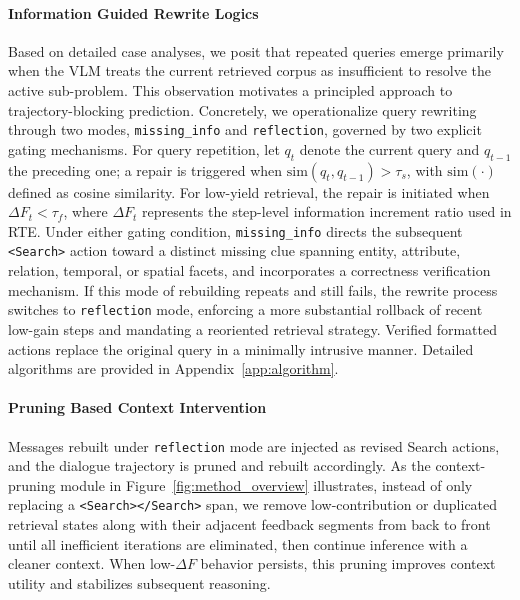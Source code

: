 \documentclass{article} %
\begin{document}
\paragraph{Information Guided Rewrite Logics}
Based on detailed case analyses, we posit that repeated queries emerge primarily when the VLM treats the current retrieved corpus as insufficient to resolve the active sub-problem.
This observation motivates a principled approach to trajectory-blocking prediction.
Concretely, we operationalize query rewriting through two modes, \texttt{missing\_info} and \texttt{reflection}, governed by two explicit gating mechanisms.
For query repetition, let $q_t$ denote the current query and $q_{t-1}$ the preceding one; a repair is triggered when $\mathrm{sim}(q_t,q_{t-1}) > \tau_s$, with $\mathrm{sim}(\cdot)$ defined as cosine similarity.
For low-yield retrieval, the repair is initiated when $\Delta F_t < \tau_f$, where $\Delta F_t$ represents the step-level information increment ratio used in RTE.
Under either gating condition, \texttt{missing\_info} directs the subsequent \texttt{<Search>} action toward a distinct missing clue spanning entity, attribute, relation, temporal, or spatial facets, and incorporates a correctness verification mechanism.
If this mode of rebuilding repeats and still fails, the rewrite process switches to \texttt{reflection} mode, enforcing a more substantial rollback of recent low-gain steps and mandating a reoriented retrieval strategy.
Verified formatted actions replace the original query in a minimally intrusive manner. Detailed algorithms are provided in Appendix~\ref{app:algorithm}.
\paragraph{Pruning Based Context Intervention}
Messages rebuilt under \texttt{reflection} mode are injected as revised Search actions, and the dialogue trajectory is pruned and rebuilt accordingly.
As the context-pruning module in Figure~\ref{fig:method_overview} illustrates, instead of only replacing a \texttt{<Search></Search>} span, we remove low-contribution or duplicated retrieval states along with their adjacent feedback segments from back to front until all inefficient iterations are eliminated, then continue inference with a cleaner context.
When low-$\Delta F$ behavior persists, this pruning improves context utility and stabilizes subsequent reasoning.
\end{document}
